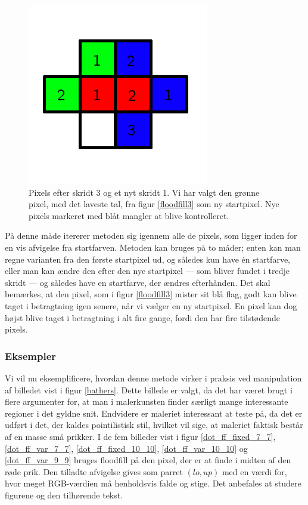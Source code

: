 {\begin{figure}[!h]
    \begin{center}
        \includegraphics[scale=0.42,angle=0]{afsnit/vores_implementation/billeder/flood_fill/floodfill4}
    \end{center}
    \caption[]{Pixels efter skridt 3 og et nyt skridt 1. Vi har valgt
    den grønne pixel, med det laveste tal, fra figur \ref{floodfill3} som
    ny startpixel. Nye pixels markeret med blåt mangler at blive
    kontrolleret.}
    \label{floodfill4}
\end{figure}

På denne måde itererer metoden sig igennem alle de pixels, som ligger
inden for en vis afvigelse fra startfarven. Metoden kan bruges på to
måder; enten kan man regne varianten fra den første startpixel ud, og
således kun have én startfarve, eller man kan ændre den efter den nye
startpixel --- som bliver fundet i tredje skridt --- og således have en
startfarve, der ændres efterhånden. Det skal bemærkes, at den pixel, som
i figur \ref{floodfill3} mister sit blå flag, godt kan blive taget i
betragtning igen senere, når vi vælger en ny startpixel. En pixel kan
dog højst blive taget i betragtning i alt fire gange, fordi den har fire
tilstødende pixels.

\subsubsection{Eksempler}
Vi vil nu eksemplificere, hvordan denne metode virker i praksis ved
manipulation af billedet vist i figur \ref{bathers}.  Dette billede er
valgt, da det har været brugt i flere argumenter for, at man i
malerkunsten finder særligt mange interessante regioner i det gyldne
snit\cite{GoldenNumber,RatioArt}. Endvidere er maleriet
interessant at teste på, da det er udført i det, der kaldes
pointilistisk stil, hvilket vil sige, at maleriet faktisk består af en
masse små prikker. I de fem billeder vist i figur
\ref{dot_ff_fixed_7_7}, \ref{dot_ff_var_7_7}, \ref{dot_ff_fixed_10_10},
\ref{dot_ff_var_10_10} og \ref{dot_ff_var_9_9} bruges floodfill på den
pixel, der er at finde i midten af den røde prik. Den tilladte afvigelse
gives som parret $(lo, up)$ med en værdi for, hvor meget RGB-værdien må
henholdsvis falde og stige. Det anbefales at studere figurene og den
tilhørende tekst.

}
